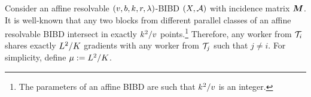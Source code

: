 \documentclass[conference,letterpaper]{IEEEtran}
\begin{document}
\begin{remark}
\label{rem:r-bibd}
Consider an affine resolvable $(v,b,k,r,\lambda)$-BIBD $(X,\mathcal{A})$ with incidence matrix $\boldsymbol{M}$. It is well-known that any two blocks from different parallel classes of an affine resolvable BIBD intersect in exactly $k^2/v$ points.\footnote{The parameters of an affine BIBD are such that $k^2/v$ is an integer.}
Therefore, any worker from $\mathcal{T}_i$ shares exactly $L^2/K$ gradients with any worker from $\mathcal{T}_j$ such that $j\ne i$. For simplicity, define $\mu: = L^2/K$.
\end{remark} 

\end{document}

